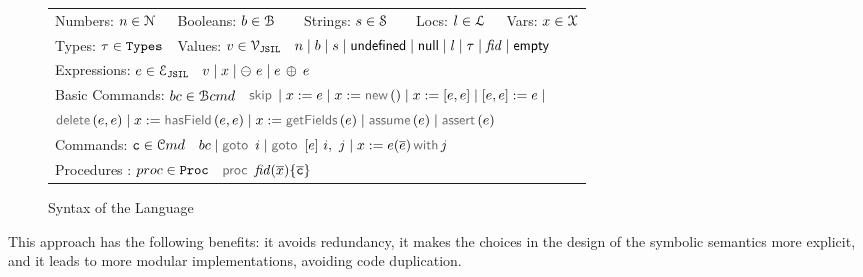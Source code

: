 \begin{figure}[!t]
\begin{minipage}{\textwidth}
\begin{tabular}{lllll}
	 Numbers: $n \in \mathcal{N}$ &  Booleans: $b \in \mathcal{B}$ & \  \ Strings: $s \in {\mathcal S}$ & \  \ Locs: $l \in {\mathcal L}$ & \  Vars: $x \in \mathcal{X}$ \\[0.1cm]
	Types: $\tau \in \mathtt{Types}$ & \multicolumn{4}{l}{Values: $v \in \mathcal{V}_{\mathtt{JSIL}}$  \ $n \mid b \mid s \mid  {\sf undefined} \mid {\sf null} \mid l \mid \tau \mid \mathit{fid} \mid {\sf empty}$} \\[0.1cm]
\multicolumn{5}{l}{Expressions: $e \in \mathcal{E}_{\mathtt{JSIL}}$  \ $v \mid x \mid \ominus\ e \mid e \, \oplus_{} \, e $} \\[0.1cm]
	\multicolumn{5}{l}{Basic Commands: $bc \in \mathcal{B}cmd$ \ $\jsilskip \mid \jvar := \jsilexpr  \mid \jvar := \jsilnew() \mid \jvar := [\jsilexpr, \jsilexpr] \mid [\jsilexpr, \jsilexpr] := \jsilexpr \mid$} \\[0.1cm]
	\multicolumn{5}{l}{\hspace{2.8cm} $\jsildelete(\jsilexpr, \jsilexpr) \mid \jvar := \hasfield(\jsilexpr, \jsilexpr) \mid \jvar := \getfields(\jsilexpr) \mid \assume(\jsilexpr) \mid \assert(\jsilexpr)$} \\[0.1cm]
	\multicolumn{5}{l}{Commands: $\mathtt{c} \in \mathcal{C}md$  \ $ \bcmd \mid \goto \ i \mid  \ifgoto{\jsilexpr}{i}{j} \mid \jsilcall{\jvar}{\jsilexpr}{\jvec{\jsilexpr}}{j}$} \\[0.1cm]
	\multicolumn{5}{l}{Procedures : $proc \in \mathtt{Proc}$  \ $\procedure{\fid}{\jvec{\jvar}}{\jvec{\ivlcmd}}$}
 \end{tabular}
 \vspace*{-0.1cm}
 \caption{Syntax of the \jsil Language}
 \label{def:jsil-types}
 \vspace*{-0.5cm}
 \end{minipage}
 \end{figure}
 
 
 This approach has the following benefits:  it avoids redundancy, 
  it makes the choices in the design of the symbolic semantics more explicit, 
and  it leads to more modular implementations, avoiding code duplication.  
 


